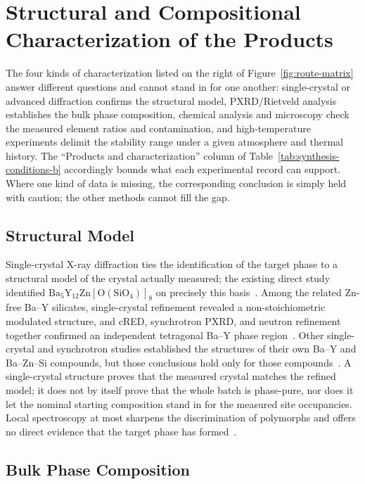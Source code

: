 \section{Structural and Compositional Characterization of the Products}
\label{sec:validation-endpoints}

The four kinds of characterization listed on the right of Figure~\ref{fig:route-matrix} answer different questions and cannot stand in for one another: single-crystal or advanced diffraction confirms the structural model, PXRD\slash Rietveld analysis establishes the bulk phase composition, chemical analysis and microscopy check the measured element ratios and contamination, and high-temperature experiments delimit the stability range under a given atmosphere and thermal history. The ``Products and characterization'' column of Table~\ref{tab:synthesis-conditions-b} accordingly bounds what each experimental record can support. Where one kind of data is missing, the corresponding conclusion is simply held with caution; the other methods cannot fill the gap.

\subsection{Structural Model}

Single-crystal X-ray diffraction ties the identification of the target phase to a structural model of the crystal actually measured; the existing direct study identified $\mathrm{Ba_5Y_{12}Zn[O(SiO_4)]_8}$ on precisely this basis~\cite{ababaikeri2024ba5y12zn}. Among the related Zn-free Ba--Y silicates, single-crystal refinement revealed a non-stoichiometric modulated structure, and cRED, synchrotron PXRD, and neutron refinement together confirmed an independent tetragonal Ba--Y phase region~\cite{yamane2024synthesis,gulay2024navigation}. Other single-crystal and synchrotron studies established the structures of their own Ba--Y and Ba--Zn--Si compounds, but those conclusions hold only for those compounds~\cite{motozawa2022bay16si4o33,zou2021crystal}. A single-crystal structure proves that the measured crystal matches the refined model; it does not by itself prove that the whole batch is phase-pure, nor does it let the nominal starting composition stand in for the measured site occupancies. Local spectroscopy at most sharpens the discrimination of polymorphs and offers no direct evidence that the target phase has formed~\cite{becerro2004revisiting}.

\subsection{Bulk Phase Composition}

